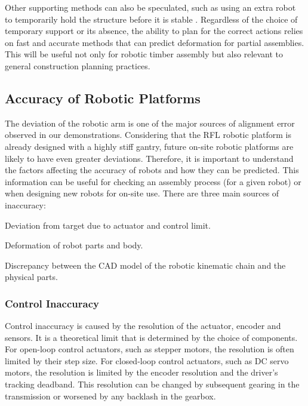 Other supporting methods can also be speculated, such as using an extra robot to temporarily hold the structure before it is stable \parencite{paraschoCooperativeRoboticAssembly2019, thomaRoboticFabricationBespoke2018}. Regardless of the choice of temporary support or its absence, the ability to plan for the correct actions relies on fast and accurate methods that can predict deformation for partial assemblies. This will be useful not only for robotic timber assembly but also relevant to general construction planning practices.

\subsection{Accuracy of Robotic Platforms}
\label{subsection:new-hypo-accuracy-of-robotic-platforms}

The deviation of the robotic arm is one of the major sources of alignment error observed in our demonstrations. Considering that the RFL robotic platform is already designed with a highly stiff gantry, future on-site robotic platforms are likely to have even greater deviations. Therefore, it is important to understand the factors affecting the accuracy of robots and how they can be predicted. This information can be useful for checking an assembly process (for a given robot) or when designing new robots for on-site use. There are three main sources of inaccuracy:

\begin{description}[] %

	\item [Control Inaccuracy --] Deviation from target due to actuator and control limit.

	\item [Mechanical Inaccuracy --] Deformation of robot parts and body.

	\item [Forward Kinematics Inaccuracy --] Discrepancy between the CAD model of the robotic kinematic chain and the physical parts.

\end{description}

\subsubsection{Control Inaccuracy}
\label{subsubsection:new-hypo-control-inaccuracy}

Control inaccuracy is caused by the resolution of the actuator, encoder and sensors. It is a theoretical limit that is determined by the choice of components. For open-loop control actuators, such as stepper motors, the resolution is often limited by their step size. For closed-loop control actuators, such as DC servo motors, the resolution is limited by the encoder resolution and the driver's tracking deadband. This resolution can be changed by subsequent gearing in the transmission or worsened by any backlash in the gearbox.

